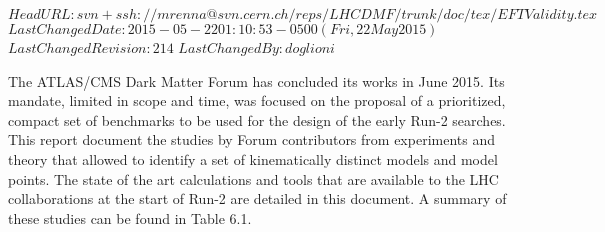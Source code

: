 \svnidlong
{$HeadURL: svn+ssh://mrenna@svn.cern.ch/reps/LHCDMF/trunk/doc/tex/EFTValidity.tex $}
{$LastChangedDate: 2015-05-22 01:10:53 -0500 (Fri, 22 May 2015) $}
{$LastChangedRevision: 214 $}
{$LastChangedBy: doglioni $}

%
%
%
%
%

The ATLAS/CMS Dark Matter Forum has concluded its works in June 2015. Its mandate, 
limited in scope and time, was focused on the proposal of a prioritized, compact set of benchmarks
to be used for the design of the early Run-2 searches. 
This report document the studies by Forum contributors from experiments and theory that allowed
to identify a set of kinematically distinct models and model points. 
The state of the art calculations and tools that are available to the LHC collaborations 
at the start of Run-2 are detailed in this document. A summary of these studies can be found in 
Table 6.1. 

